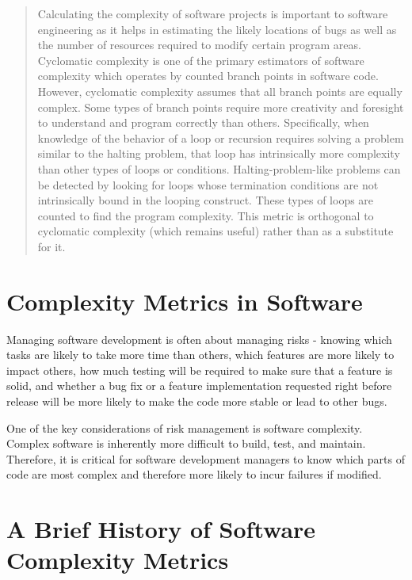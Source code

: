 
\begin{abstract}
Calculating the complexity of software projects is important to software engineering as it helps in estimating the likely locations of bugs as well as the number of resources required to modify certain program areas.  Cyclomatic complexity is one of the primary estimators of software complexity which operates by counted branch points in software code.  However, cyclomatic complexity assumes that all branch points are equally complex.  Some types of branch points require more creativity and foresight to understand and program correctly than others.  Specifically, when knowledge of the behavior of a loop or recursion requires solving a problem similar to the halting problem, that loop has intrinsically more complexity than other types of loops or conditions.  Halting-problem-like problems can be detected by looking for loops whose termination conditions are not intrinsically bound in the looping construct.  These types of loops are counted to find the program complexity.  This metric is orthogonal to cyclomatic complexity (which remains useful) rather than as a substitute for it.
\end{abstract}

\section{Complexity Metrics in Software}

Managing software development is often about managing risks - knowing which tasks are likely to take more time than others, which features are more likely to impact others, how much testing will be required to make sure that a feature is solid, and whether a bug fix or a feature implementation requested right before release will be more likely to make the code more stable or lead to other bugs.

One of the key considerations of risk management is software complexity.  Complex software is inherently more difficult to build, test, and maintain.  Therefore, it is critical for software development managers to know which parts of code are most complex and therefore more likely to incur failures if modified.

\section{A Brief History of Software Complexity Metrics}

